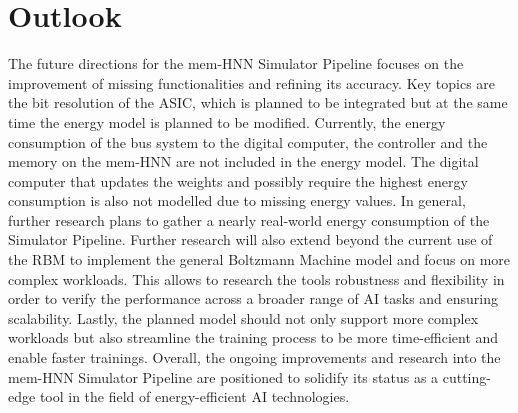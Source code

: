 \section{Outlook}
The future directions for the \ac{mem-HNN} Simulator Pipeline focuses on the improvement of missing functionalities and refining its accuracy. 
Key topics are the bit resolution of the \ac{ASIC}, which is planned to be integrated but at the same time the energy model is planned
to be modified.
Currently, the energy consumption of the bus system to the digital computer, the controller and the memory on the \ac{mem-HNN} 
are not included in the energy model.
The digital computer that updates the weights and possibly require the highest energy consumption is also not modelled due to missing energy values.
In general, further research plans to gather a nearly real-world energy consumption of the Simulator Pipeline.
Further research will also extend beyond the current use of the \ac{RBM} to implement the general Boltzmann Machine model and focus on more complex workloads.
This allows to research the tools robustness and flexibility in order to verify the performance across a broader range of AI tasks and ensuring scalability.
Lastly, the planned model should not only support more complex workloads but also streamline the training process to be more time-efficient and enable faster trainings.
Overall, the ongoing improvements and research into the \ac{mem-HNN} Simulator Pipeline are positioned to solidify its status as a cutting-edge tool in the field of energy-efficient AI technologies.